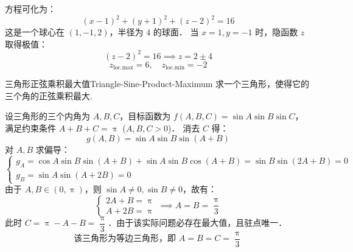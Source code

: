 \begin{solution}
    方程可化为：
    \begin{equation}
        (x - 1)^2 + (y + 1)^2 + (z - 2)^2 = 16
    \end{equation}
    这是一个球心在 $(1, -1, 2)$，半径为 $4$ 的球面．
    当 $x = 1, y = -1$ 时，隐函数 $z$ 取得极值：
    \begin{equation}
        (z - 2)^2 = 16 \implies z = 2 \pm 4
    \end{equation}
    \begin{equation}
        \boxed{z_{\text{loc.max}} = 6, \quad z_{\text{loc.min}} = -2}
    \end{equation}
\end{solution}

\begin{problem}{三角形正弦乘积最大值}{Triangle-Sine-Product-Maximum}
    求一个三角形，使得它的三个角的正弦乘积最大.
\end{problem}

\begin{solution}
    设三角形的三个内角为 $A, B, C$，目标函数为 $f(A, B, C) = \sin A \sin B \sin C$，满足约束条件 $A + B + C = \uppi$ ($A, B, C > 0$)．
    消去 $C$ 得：
    \begin{equation}
        g(A, B) = \sin A \sin B \sin(A + B)
    \end{equation}
    对 $A, B$ 求偏导：
    \begin{equation}
        \begin{cases}
            g_A = \cos A \sin B \sin(A+B) + \sin A \sin B \cos(A+B) = \sin B \sin(2A+B) = 0 \\
            g_B = \sin A \sin(A+2B) = 0
        \end{cases}
    \end{equation}
    由于 $A, B \in (0, \uppi)$，则 $\sin A \neq 0, \sin B \neq 0$，故有：
    \begin{equation}
        \begin{cases}
            2A + B = \uppi \\
            A + 2B = \uppi
        \end{cases} \implies A = B = \frac{\uppi}{3}
    \end{equation}
    此时 $C = \uppi - A - B = \dfrac{\uppi}{3}$．由于该实际问题必存在最大值，且驻点唯一．
    \begin{equation}
        \boxed{\text{该三角形为等边三角形，即 } A = B = C = \frac{\uppi}{3}}
    \end{equation}
\end{solution}



